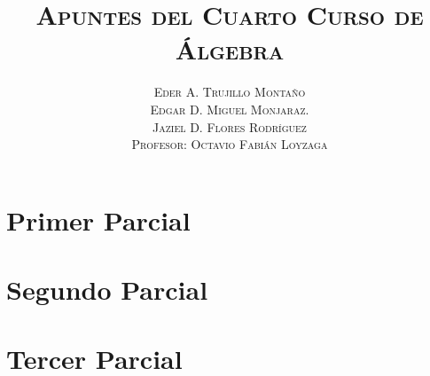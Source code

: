 \documentclass[b5paper]{book}
\title{\textsc{Apuntes del Cuarto Curso de Álgebra \vspace{3mm}
\vspace{1cm}}}
\author{\textsc{Eder A. Trujillo Montaño} \\
\textsc{Edgar D. Miguel Monjaraz.} \\ 
\textsc{Jaziel D. Flores Rodríguez}\\
\textsc{Profesor: Octavio Fabián Loyzaga} \vspace{1cm}}
\theoremstyle{definition}
\theoremstyle{plain}
\begin{document}
\maketitle
\onehalfspace
\chapter{Primer Parcial}

\chapter{Segundo Parcial}

\chapter{Tercer Parcial}

\end{document}
